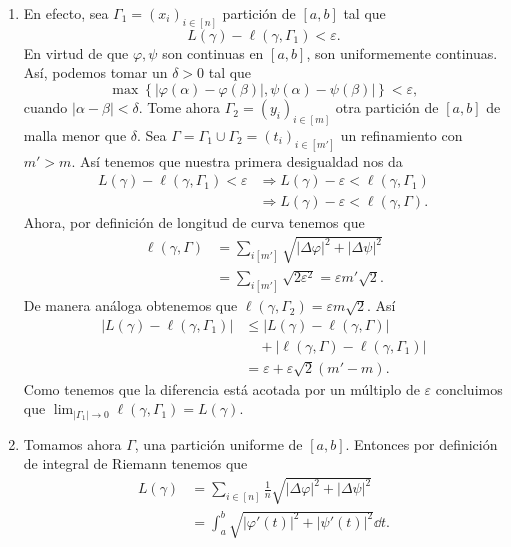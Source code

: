 \documentclass[12pt]{article}
\theoremstyle{plain}
\theoremstyle{definition}
\theoremstyle{remark}
\numberwithin{equation}{section}
\renewcommand{\leq}{\leqslant}      %
\renewcommand{\:}{\colon}           %
\newcommand{\conj}[1]{\left\lbrace#1\right\rbrace}
\newcommand{\bonj}[1]{\left\lbrack#1\right\rbrack}
\begin{document}
\begin{multicols}{2}
\begin{ptcbp}
\begin{enumerate}
  \item En efecto, sea $\Gamma_1=(x_i)_{i\in\bonj{n}}$ partición de $\bonj{a,b}$ tal que
  $$L(\gamma)-\ell(\gamma,\Gamma_1)<\varepsilon.$$
  En virtud de que $\varphi,\psi$ son continuas en $\bonj{a,b}$, son uniformemente continuas. Así, podemos tomar un $\delta >0$ tal que
  $$\max\conj{|\varphi(\alpha)-\varphi(\beta)|,\psi(\alpha)-\psi(\beta)|}<\varepsilon,$$
  cuando $|\alpha-\beta|<\delta$. Tome ahora $\Gamma_2=(y_i)_{i\in\bonj{m}}$ otra partición de $\bonj{a,b}$ de malla menor que $\delta$. Sea $\Gamma=\Gamma_1\cup\Gamma_2=(t_i)_{i\in\bonj{m'}}$ un refinamiento con $m'>m$. Así tenemos que nuestra primera desigualdad nos da
  \begin{align*}
    L(\gamma)-\ell(\gamma,\Gamma_1)<\varepsilon & \Rightarrow L(\gamma)-\varepsilon<\ell(\gamma,\Gamma_1)\\
    &\Rightarrow L(\gamma)-\varepsilon<\ell(\gamma,\Gamma).
  \end{align*}
  Ahora, por definición de longitud de curva tenemos que
  \begin{align*}
    \ell(\gamma,\Gamma) &=\sum_{i\bonj{m'}}\sqrt{|\Delta\varphi|^2+|\Delta\psi|^2}\\
    &=\sum_{i\bonj{m'}}\sqrt{2\varepsilon^2}=\varepsilon m'\sqrt{2}.
  \end{align*}
  De manera análoga obtenemos que $\ell(\gamma,\Gamma_2)=\varepsilon m\sqrt{2}$. Así
  \begin{align*}
    |L(\gamma)-\ell(\gamma,\Gamma_1)| &\leq |L(\gamma)-\ell(\gamma,\Gamma)|\\
    &\quad+|\ell(\gamma,\Gamma)-\ell(\gamma,\Gamma_1)|\\
    &=\varepsilon+\varepsilon\sqrt{2}(m'-m).
  \end{align*}
  Como tenemos que la diferencia está acotada por un múltiplo de $\varepsilon$ concluimos que $\lim_{|\Gamma_1|\to 0}\ell(\gamma,\Gamma_1)=L(\gamma)$.
  \item Tomamos ahora $\Gamma$, una partición uniforme de $\bonj{a,b}$. Entonces por definición de integral de Riemann tenemos que
      \begin{align*}
        L(\gamma) &=\sum_{i\in\bonj{n}}\frac{1}{n}\sqrt{|\Delta\varphi|^2+|\Delta\psi|^2}\\
        &=\int_{a}^{b}\sqrt{|\varphi'(t)|^2+|\psi'(t)|^2}\dd t.
      \end{align*}
\end{enumerate}
\end{ptcbp}


\end{multicols}
\end{document}
